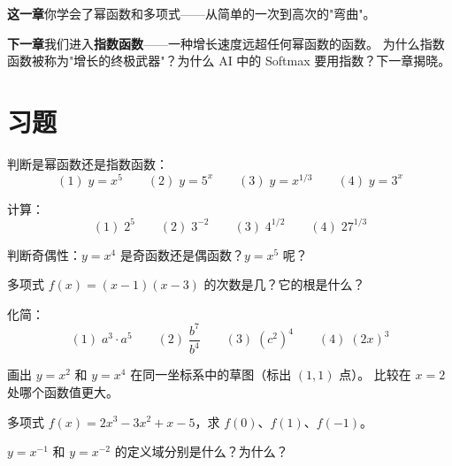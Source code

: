 \textbf{这一章}你学会了幂函数和多项式——从简单的一次到高次的"弯曲"。

\textbf{下一章}我们进入\textbf{指数函数}——一种增长速度远超任何幂函数的函数。
为什么指数函数被称为"增长的终极武器"？为什么 AI 中的 Softmax 要用指数？下一章揭晓。


\section{习题}


\begin{exercise}[0]
判断是幂函数还是指数函数：
\[
(1)\; y = x^5 \qquad
(2)\; y = 5^x \qquad
(3)\; y = x^{1/3} \qquad
(4)\; y = 3^x
\]
\end{exercise}

\begin{exercise}[0]
计算：
\[
(1)\; 2^5 \qquad
(2)\; 3^{-2} \qquad
(3)\; 4^{1/2} \qquad
(4)\; 27^{1/3}
\]
\end{exercise}

\begin{exercise}[0]
判断奇偶性：\(y = x^4\) 是奇函数还是偶函数？\(y = x^5\) 呢？
\end{exercise}

\begin{exercise}[0]
多项式 \(f(x) = (x-1)(x-3)\) 的次数是几？它的根是什么？
\end{exercise}


\begin{exercise}[1]
化简：
\[
(1)\; a^3 \cdot a^5 \qquad
(2)\; \frac{b^7}{b^4} \qquad
(3)\; (c^2)^4 \qquad
(4)\; (2x)^3
\]
\end{exercise}

\begin{exercise}[1]
画出 \(y = x^2\) 和 \(y = x^4\) 在同一坐标系中的草图（标出 \((1,1)\) 点）。
比较在 \(x=2\) 处哪个函数值更大。
\end{exercise}

\begin{exercise}[1]
多项式 \(f(x) = 2x^3 - 3x^2 + x - 5\)，求 \(f(0)\)、\(f(1)\)、\(f(-1)\)。
\end{exercise}

\begin{exercise}[1]
\(y = x^{-1}\) 和 \(y = x^{-2}\) 的定义域分别是什么？为什么？
\end{exercise}

